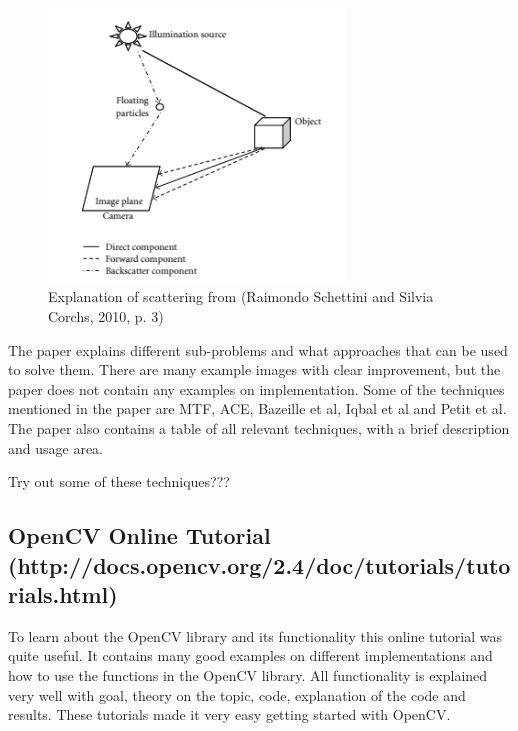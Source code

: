 \begin{figure}[h]
    \centering
    \includegraphics[width=0.7\textwidth]{Images/image_from_paper}
    \caption{Explanation of scattering from (Raimondo Schettini and Silvia Corchs, 2010, p. 3)}
    \label{fig:image_from_paper}
\end{figure}

The paper explains different sub-problems and what approaches that can be used to solve them. There are many example images with clear improvement, but the paper does not contain any examples on implementation. Some of the techniques mentioned in the paper are MTF, ACE, Bazeille et al, Iqbal et al and Petit et al. The paper also contains a table of all relevant techniques, with a brief description and usage area.

{\color{red}Try out some of these techniques???}


\subsection{OpenCV Online Tutorial \\
(http://docs.opencv.org/2.4/doc/tutorials/tutorials.html)}
To learn about the OpenCV library and its functionality this online tutorial was quite useful. It contains many good examples on different implementations and how to use the functions in the OpenCV library. All functionality is explained very well with goal, theory on the topic, code, explanation of the code and results. These tutorials made it very easy getting started with OpenCV.
